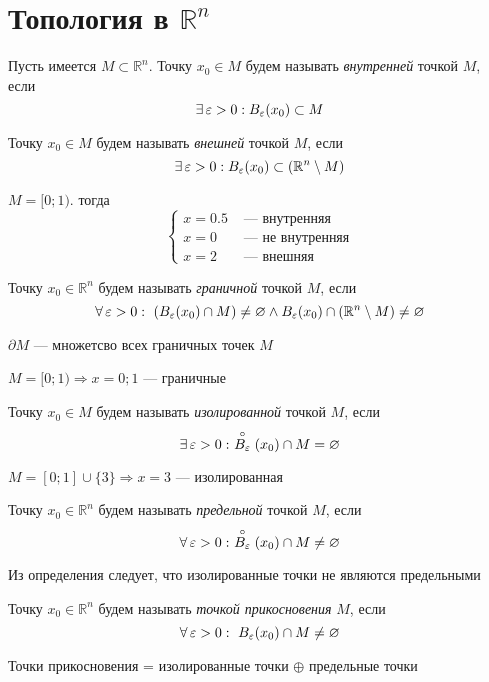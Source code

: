 \section{Топология в $\mathbb{R}^n$}
 Пусть имеется $M\subset\mathbb{R}^n$. Точку $x_0\in M$ будем называть \textit{внутренней} точкой $M$, если $$\exists\operatorname{\varepsilon}>0:B_{\operatorname{\varepsilon}}(x_0)\subset M$$

 Точку $x_0\in M$ будем называть \textit{внешней} точкой $M$, если $$\exists\operatorname{\varepsilon}>0:B_{\operatorname{\varepsilon}}(x_0)\subset (\mathbb{R}^n\setminus M)$$

\ex $M=[0;1)$. тогда
\begin{equation*}
    \begin{cases}
        x=0.5&\text{ — внутренняя}\\
        x=0&\text{ — не внутренняя}\\
        x=2&\text{ — внешняя}
    \end{cases}
\end{equation*}

 Точку $x_0\in\mathbb{R}^n$ будем называть \textit{граничной} точкой $M$, если $$\forall \ve>0:\ \left(B_{\ve}(x_0)\cap M\right)\ne\varnothing\wedge B_{\ve}(x_0)\cap(\mathbb{R}^n\setminus M)\ne\varnothing$$

\mark $\partial M$ — множетсво всех граничных точек $M$

\begin{center}
    
\end{center}


\ex $M=[0;1)\Longrightarrow x=0;1$ — граничные

 Точку $x_0\in M$ будем называть \textit{изолированной} точкой $M$, если $$\exists \ve>0:\ \stackrel{\circ}{B_{\ve}}(x_0)\cap M=\varnothing$$

\ex $M=[0;1]\cup \{3\}\Longrightarrow x=3$ — изолированная

 Точку $x_0\in\mathbb{R}^n$ будем называть \textit{предельной} точкой $M$, если $$\forall \ve>0:\ \stackrel{\circ}{B_{\ve}}(x_0)\cap M\ne\varnothing$$

\comment Из определения следует, что изолированные точки не являются предельными

 Точку $x_0\in\mathbb{R}^n$ будем называть \textit{точкой прикосновения} $M$, если $$\forall \operatorname{\varepsilon}>0:\ B_{\operatorname{\varepsilon}}(x_0)\cap M\ne\varnothing$$

\comment Точки прикосновения = изолированные точки $\oplus$ предельные точки

